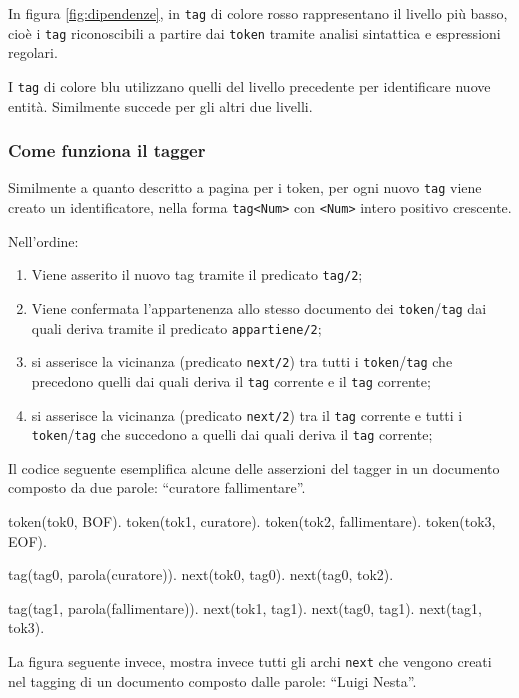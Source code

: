 In figura \ref{fig:dipendenze}, in \verb|tag| di colore rosso rappresentano il livello più basso, cioè i \verb|tag| riconoscibili a partire dai \verb|token| tramite analisi sintattica e espressioni regolari.

I \verb|tag| di colore blu utilizzano quelli del livello precedente per identificare nuove entità. Similmente succede per gli altri due livelli.

\subsubsection{Come funziona il tagger}

Similmente a quanto descritto a pagina \pageref{sec:creazionetoken} per i token, per ogni nuovo \verb|tag| viene creato un identificatore, nella forma \verb:tag<Num>: con \verb+<Num>+ intero positivo crescente.

Nell'ordine:
\begin{enumerate}
\item Viene asserito il nuovo tag tramite il predicato \verb|tag/2|;
\item Viene confermata l'appartenenza allo stesso documento dei \verb|token|/\verb|tag| dai quali deriva tramite il predicato \verb|appartiene/2|;
\item si asserisce la vicinanza (predicato \verb|next/2|) tra tutti i \verb|token|/\verb|tag| che precedono quelli dai quali deriva il \verb|tag| corrente e il \verb|tag| corrente;
\item si asserisce la vicinanza (predicato \verb|next/2|) tra il \verb|tag| corrente e tutti i \verb|token|/\verb|tag| che succedono a quelli dai quali deriva il \verb|tag| corrente;
\end{enumerate} 

Il codice seguente esemplifica alcune delle asserzioni del tagger in un documento composto da due parole: ``curatore fallimentare''.

\begin{prologcode}
token(tok0, BOF).
token(tok1, curatore).
token(tok2, fallimentare).
token(tok3, EOF).

tag(tag0, parola(curatore)).
next(tok0, tag0).
next(tag0, tok2).

tag(tag1, parola(fallimentare)).
next(tok1, tag1).
next(tag0, tag1).
next(tag1, tok3).
\end{prologcode}

La figura seguente invece, mostra invece tutti gli archi \verb|next| che vengono creati nel tagging di un documento composto dalle parole: ``Luigi Nesta''.

